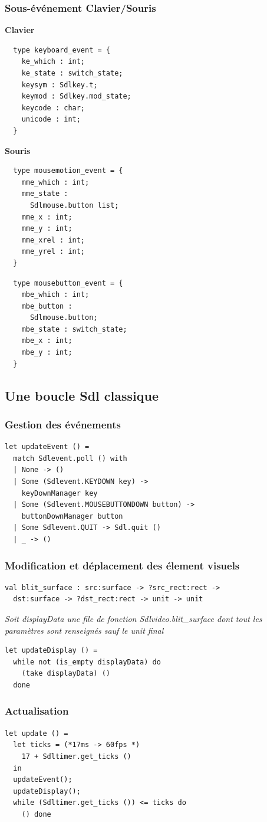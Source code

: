 \begin{frame}[fragile]
	\frametitle{Sous-événement Clavier/Souris}
	\textbf{Clavier}
	\lstset{basicstyle=\scriptsize}
	\begin{lstlisting}
  type keyboard_event = {
    ke_which : int;
    ke_state : switch_state;
    keysym : Sdlkey.t;
    keymod : Sdlkey.mod_state;
    keycode : char;
    unicode : int;
  }
	\end{lstlisting}
	\textbf{Souris}\\
	\begin{minipage}{0.47\textwidth}
		\begin{lstlisting}
  type mousemotion_event = {
    mme_which : int;
    mme_state : 
      Sdlmouse.button list;
    mme_x : int;
    mme_y : int;
    mme_xrel : int;
    mme_yrel : int;
  }
		\end{lstlisting}
	\end{minipage}
	\begin{minipage}{0.4\textwidth}
		\begin{lstlisting}
  type mousebutton_event = {
    mbe_which : int;
    mbe_button : 
      Sdlmouse.button;
    mbe_state : switch_state;
    mbe_x : int;
    mbe_y : int;
  }
		\end{lstlisting}
	\end{minipage}
\end{frame}

\subsection{Une boucle Sdl classique} %
\begin{frame}[fragile]
	\frametitle{Gestion des événements}
	\begin{lstlisting}
let updateEvent () = 
  match Sdlevent.poll () with
  | None -> ()
  | Some (Sdlevent.KEYDOWN key) -> 
    keyDownManager key
  | Some (Sdlevent.MOUSEBUTTONDOWN button) -> 
    buttonDownManager button
  | Some Sdlevent.QUIT -> Sdl.quit ()
  | _ -> ()
	\end{lstlisting}
\end{frame}

\begin{frame}[fragile]
	\frametitle{Modification et déplacement des élement visuels}
	\lstset{basicstyle=\scriptsize}
	\begin{lstlisting}
val blit_surface : src:surface -> ?src_rect:rect -> 
  dst:surface -> ?dst_rect:rect -> unit -> unit
	\end{lstlisting}
	\textit{Soit displayData une file de fonction Sdlvideo.blit\_surface dont tout les paramètres sont renseignés sauf le unit final}
	\lstset{basicstyle=\normalsize}
	\begin{lstlisting}
let updateDisplay () = 
  while not (is_empty displayData) do
    (take displayData) ()
  done
	\end{lstlisting}
\end{frame}

\begin{frame}[fragile]
	\frametitle{Actualisation}
	\begin{lstlisting}
let update () =
  let ticks = (*17ms -> 60fps *) 
    17 + Sdltimer.get_ticks () 
  in
  updateEvent();
  updateDisplay();
  while (Sdltimer.get_ticks ()) <= ticks do 
    () done
	\end{lstlisting}
\end{frame}
